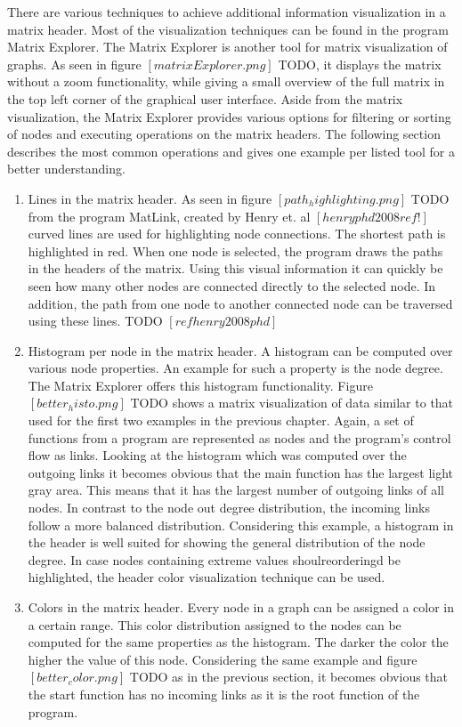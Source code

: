 There are various techniques to achieve additional information visualization in a matrix header. Most of the visualization techniques can be found in the program Matrix Explorer. The Matrix Explorer is another tool for matrix visualization of graphs. As seen in figure $[matrixExplorer.png]$ TODO, it displays the matrix without a zoom functionality, while giving a small overview of the full matrix in the top left corner of the graphical user interface. Aside from the matrix visualization, the Matrix Explorer provides various options for filtering or sorting of nodes and executing operations on the matrix headers. The following section describes the most common operations and gives one example per listed tool for a better understanding. 
\begin{enumerate}
	\item Lines in the matrix header. As seen in figure $[path_highlighting.png]$ TODO from the program MatLink, created by Henry et. al $[henry phd 2008 ref!]$ curved lines are used for highlighting node connections. The shortest path is highlighted in red. When one node is selected, the program draws the paths in the headers of the matrix. Using this visual information it can quickly be seen how many other nodes are connected directly to the selected node. In addition, the path from one node to another connected node can be traversed using these lines. TODO $[ref henry 2008 phd]$

	\item Histogram per node in the matrix header. A histogram can be computed over various node properties. An example for such a property is the node degree. The Matrix Explorer offers this histogram functionality. Figure $[better_histo.png]$ TODO shows a matrix visualization of data similar to that used for the first two examples in the previous chapter. Again, a set of functions from a program are represented as nodes and the program’s control flow as links. Looking at the histogram which was computed over the outgoing links it becomes obvious that the main function has the largest light gray area. This means that it has the largest number of outgoing links of all nodes. In contrast to the node out degree distribution, the incoming links follow a more balanced distribution. Considering this example, a histogram in the header is well suited for showing the general distribution of the node degree. In case nodes containing extreme values shoulreorderingd be highlighted, the header color visualization technique can be used.

	\item Colors in the matrix header. Every node in a graph can be assigned a color in a certain range. This color distribution assigned to the nodes can be computed for the same properties as the histogram. The darker the color the higher the value of this node. Considering the same example and figure $[better_color.png]$ TODO as in the previous section, it becomes obvious that the start function has no incoming links as it is the root function of the program.


\end{enumerate}
